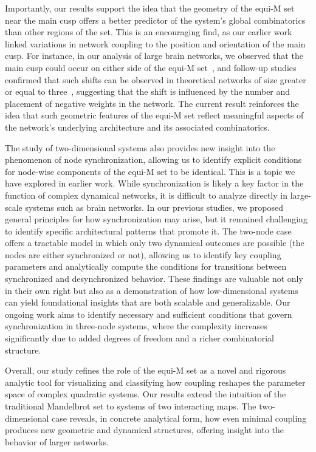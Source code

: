 \documentclass[10pt]{article}
\begin{document}
Importantly, our results support the idea that the geometry of the equi-M set near the main cusp offers a better predictor of the system’s global combinatorics than other regions of the set. This is an encouraging find, as our earlier work linked variations in network coupling to the position and orientation of the main cusp. For instance, in our analysis of large brain networks, we observed that the main cusp could occur on either side of the equi-M set~\cite{Simone}, and follow-up studies confirmed that such shifts can be observed in theoretical networks of size greater or equal to three~\cite{AC2}, suggesting that the shift is influenced by the number and placement of negative weights in the network. The current result reinforces the idea that such geometric features of the equi-M set reflect meaningful aspects of the network’s underlying architecture and its associated combinatorics.

The study of two-dimensional systems also provides new insight into the phenomenon of node synchronization, allowing us to identify explicit conditions for node-wise components of the equi-M set to be identical. This is a topic we have explored in earlier work. While synchronization is likely a key factor in the function of complex dynamical networks, it is difficult to analyze directly in large-scale systems such as brain networks. In our previous studies, we proposed general principles for how synchronization may arise, but it remained challenging to identify specific architectural patterns that promote it. The two-node case offers a tractable model in which only two dynamical outcomes are possible (the nodes are either synchronized or not), allowing us to identify key coupling parameters and analytically compute the conditions for transitions between synchronized and desynchronized behavior. These findings are valuable not only in their own right but also as a demonstration of how low-dimensional systems can yield foundational insights that are both scalable and generalizable. Our ongoing work aims to identify necessary and sufficient conditions that govern synchronization in three-node systems, where the complexity increases significantly due to added degrees of freedom and a richer combinatorial structure.

Overall, our study refines the role of the equi-M set as a novel and rigorous analytic tool for visualizing and classifying how coupling reshapes the parameter space of complex quadratic systems. Our results extend the intuition of the traditional Mandelbrot set to systems of two interacting maps. The two-dimensional case reveals, in concrete analytical form, how even minimal coupling produces new geometric and dynamical structures, offering insight into the behavior of larger networks.
\end{document}
